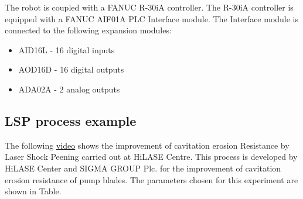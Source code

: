 The robot is coupled with a FANUC R-30iA controller. The R-30iA controller is equipped with a FANUC AIF01A PLC Interface module. The Interface module is connected to the following expansion modules:

\begin{itemize}
    \item AID16L - 16 digital inputs
    \item AOD16D - 16 digital outputs
    \item ADA02A - 2 analog outputs \cite{fanucunitmanual}
\end{itemize}

\subsection{LSP process example}

The following \href{https://www.youtube.com/watch?v=awhlLU91-dk&ab_channel=HiLASECentre}{video} shows the improvement of cavitation erosion Resistance by Laser Shock Peening carried out at HiLASE Centre. This process is developed by HiLASE Center and SIGMA GROUP Plc. for the improvement of cavitation erosion resistance of pump blades. The parameters chosen for this experiment are shown in Table. 

